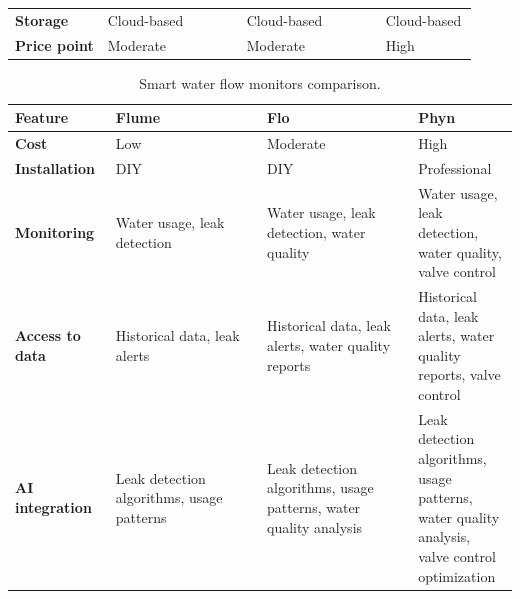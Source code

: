 {\begin{table}[ht]
\begin{tabular}{p{0.2\linewidth} | p{0.3\linewidth} | p{0.3\linewidth} | p{0.3\linewidth}}
    \textbf{Storage}        & Cloud-based                                    & Cloud-based                                                                & Cloud-based                                                                                              \\
    \textbf{Price point}    & Moderate                                       & Moderate                                                                   & High                                                                                                    
    \end{tabular}
\end{table}
{\renewcommand{\arraystretch}{1}%

{\renewcommand{\arraystretch}{2}%
\begin{table}[ht]
    \caption{Smart water flow monitors comparison.}
    \label{tab:smart-water-flow-monitors-comparison}
    \hskip-1.8cm\begin{tabular}{p{0.2\linewidth} | p{0.3\linewidth} | p{0.3\linewidth} | p{0.3\linewidth}}
    \textbf{Feature}        & \textbf{Flume} \cite{Flume2024}           & \textbf{Flo} \cite{Flo2024}                                       & \textbf{Phyn} \cite{Phyn2024}                                                                 \\ \midrule
    \textbf{Cost}           & Low                                       & Moderate                                                          & High                                                                                          \\
    \textbf{Installation}   & DIY                                       & DIY                                                               & Professional                                                                                  \\
    \textbf{Monitoring}     & Water usage, leak detection               & Water usage, leak detection, water quality                        & Water usage, leak detection, water quality, valve control                                     \\
    \textbf{Access to data} & Historical data, leak alerts              & Historical data, leak alerts, water quality reports               & Historical data, leak alerts, water quality reports, valve control                            \\
    \textbf{AI integration} & Leak detection algorithms, usage patterns & Leak detection algorithms, usage patterns, water quality analysis & Leak detection algorithms, usage patterns, water quality analysis, valve control optimization \\

\end{tabular}
\end{table}}}}
